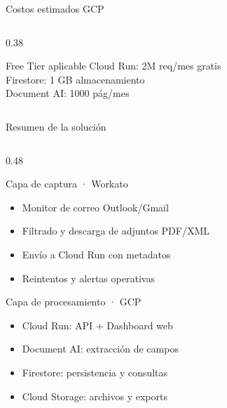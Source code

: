 \documentclass[aspectratio=169]{beamer}
\begin{document}
\begin{frame}{Costos estimados GCP}
\begin{columns}[T]
\begin{column}{0.38\textwidth}
  \vspace{0.3cm}

  \begin{exampleblock}{Free Tier aplicable}
    \footnotesize
    Cloud Run: 2M req/mes gratis\\
    Firestore: 1 GB almacenamiento\\
    Document AI: 1000 pág/mes
  \end{exampleblock}
\end{column}
\end{columns}
\end{frame}

\begin{frame}{Resumen de la solución}
\begin{columns}[T]
\begin{column}{0.48\textwidth}
  \begin{block}{Capa de captura · Workato}
    \begin{itemize}
      \item Monitor de correo Outlook/Gmail
      \item Filtrado y descarga de adjuntos PDF/XML
      \item Envío a Cloud Run con metadatos
      \item Reintentos y alertas operativas
    \end{itemize}
  \end{block}

  \vspace{0.3cm}

  \begin{block}{Capa de procesamiento · GCP}
    \begin{itemize}
      \item Cloud Run: API + Dashboard web
      \item Document AI: extracción de campos
      \item Firestore: persistencia y consultas
      \item Cloud Storage: archivos y exports
    \end{itemize}
  \end{block}
\end{column}


\end{columns}
\end{frame}
\end{document}
